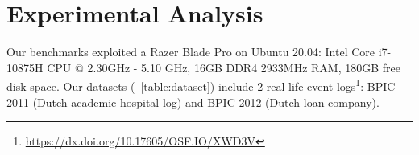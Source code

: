 \begin{table}[!t]
\caption{Range of datasets used for benchmarking.}
\label{table:dataset}
\end{table}
\section{Experimental Analysis}\label{sec:exp}
Our benchmarks exploited a Razer Blade Pro on Ubuntu 20.04: Intel Core i7-10875H CPU @ 2.30GHz - 5.10 GHz, 16GB DDR4 2933MHz RAM, 180GB free disk space. Our datasets (\tablename~\ref{table:dataset}) include 2 real life event logs\footnote{\url{https://dx.doi.org/10.17605/OSF.IO/XWD3V}\label{footnote:datasets}}: \textsf{BPIC 2011} (Dutch academic hospital log) and \textsf{BPIC 2012 } (Dutch loan company).




